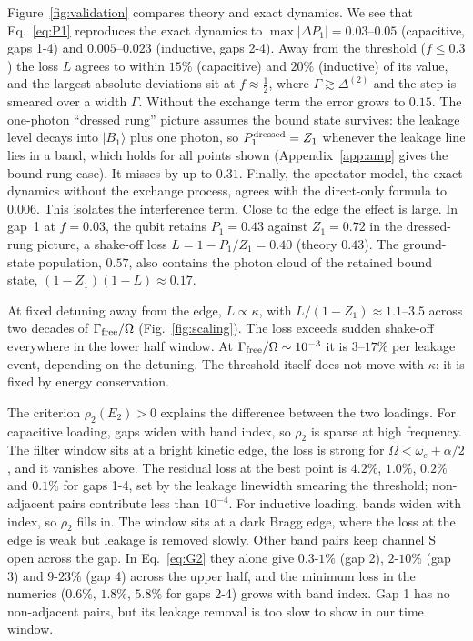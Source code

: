 \documentclass[aps,prresearch,twocolumn,superscriptaddress,nofootinbib,longbibliography,floatfix]{revtex4-2}
\begin{document}
Figure~\ref{fig:validation} compares theory and exact dynamics.
We see that Eq.~\eqref{eq:P1} reproduces the exact dynamics to $\max|\Delta P_1|=0.03$--$0.05$ (capacitive, gaps 1-4)
and $0.005$--$0.023$ (inductive, gaps 2-4). Away from the threshold ($f\le0.3$) the loss $L$ agrees to within $15\%$
(capacitive) and $20\%$ (inductive) of its value, and the largest absolute deviations sit at $f\approx\tfrac12$, where $\Gamma\gtrsim\Delta^{(2)}$ and the step is smeared over a width $\Gamma$. 
Without the exchange term the error grows to $0.15$. The one-photon ``dressed rung'' picture assumes the bound
state survives: the leakage level decays into $|B_1\rangle$ plus one photon, so $P_1^{\rm dressed}=Z_1$ whenever the
leakage line lies in a band, which holds for all points shown (Appendix~\ref{app:amp} gives the bound-rung case). It
misses by up to $0.31$.
Finally, the spectator model, the exact dynamics without the exchange process, agrees with the direct-only formula to
$0.006$. This isolates the interference term.
Close to the edge the effect is large. In gap~1 at $f=0.03$, the qubit retains $P_1=0.43$ against $Z_1=0.72$ in
the dressed-rung picture, a shake-off loss $L=1-P_1/Z_1=0.40$ (theory $0.43$). The ground-state population, $0.57$,
also contains the photon cloud of the retained bound state, $(1-Z_1)(1-L)\approx0.17$.



At fixed detuning away from the edge, $L\propto\kappa$, with $L/(1-Z_1)\approx1.1$--$3.5$ across two decades of
$\Gamma_{\rm free}/\Omega$ (Fig.~\ref{fig:scaling}). The loss exceeds sudden shake-off everywhere in the lower half
window. At $\Gamma_{\rm free}/\Omega\sim10^{-3}$ it is $3$--$17\%$ per leakage event, depending on the detuning. The
threshold itself does not move with $\kappa$: it is fixed by energy conservation.


The criterion $\rho_2(E_2)>0$ explains the difference between the two loadings.
For capacitive loading, gaps widen with band index, so $\rho_2$ is sparse at high frequency. The filter window sits at a
bright kinetic edge, the loss is strong for $\Omega<\omega_e+\alpha/2$, and it vanishes above. The residual loss at the
best point is $4.2\%$, $1.0\%$, $0.2\%$ and $0.1\%$ for gaps 1-4, set by the leakage linewidth smearing the threshold;
non-adjacent pairs contribute less than $10^{-4}$.
For inductive loading, bands widen with index, so $\rho_2$ fills in. The window sits at a dark Bragg edge, where the
loss at the edge is weak but leakage is removed slowly. Other band pairs keep channel S open across the gap. In
Eq.~\eqref{eq:G2} they alone give $0.3$-$1\%$ (gap 2), $2$-$10\%$ (gap 3) and $9$-$23\%$ (gap 4) across the upper
half, and the minimum loss in the numerics ($0.6\%$, $1.8\%$, $5.8\%$ for gaps 2-4) grows with band index. Gap 1 has
no non-adjacent pairs, but its leakage removal is too slow to show in our time window.
\end{document}
